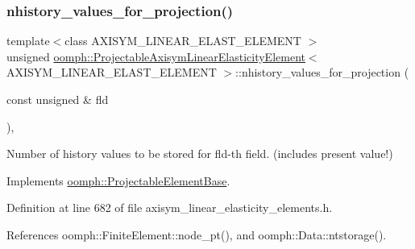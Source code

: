 \subsubsection{\texorpdfstring{nhistory\+\_\+values\+\_\+for\+\_\+projection()}{nhistory\_values\_for\_projection()}}
{\footnotesize\ttfamily template$<$class A\+X\+I\+S\+Y\+M\+\_\+\+L\+I\+N\+E\+A\+R\+\_\+\+E\+L\+A\+S\+T\+\_\+\+E\+L\+E\+M\+E\+NT $>$ \\
unsigned \hyperlink{classoomph_1_1ProjectableAxisymLinearElasticityElement}{oomph\+::\+Projectable\+Axisym\+Linear\+Elasticity\+Element}$<$ A\+X\+I\+S\+Y\+M\+\_\+\+L\+I\+N\+E\+A\+R\+\_\+\+E\+L\+A\+S\+T\+\_\+\+E\+L\+E\+M\+E\+NT $>$\+::nhistory\+\_\+values\+\_\+for\+\_\+projection (\begin{DoxyParamCaption}\item[{const unsigned \&}]{fld }\end{DoxyParamCaption})\hspace{0.3cm}{\ttfamily [inline]}, {\ttfamily [virtual]}}



Number of history values to be stored for fld-\/th field. (includes present value!) 



Implements \hyperlink{classoomph_1_1ProjectableElementBase_ac6790f394630b964663281f8740f43a5}{oomph\+::\+Projectable\+Element\+Base}.



Definition at line 682 of file axisym\+\_\+linear\+\_\+elasticity\+\_\+elements.\+h.



References oomph\+::\+Finite\+Element\+::node\+\_\+pt(), and oomph\+::\+Data\+::ntstorage().

\mbox{\label{classoomph_1_1ProjectableAxisymLinearElasticityElement_a00715989f89c46ba103194baf8e359b2}} 
